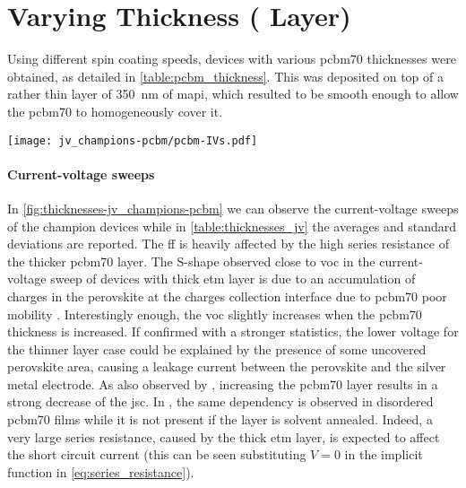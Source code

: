 \section{Varying  Thickness ( Layer)}
Using different spin coating speeds, devices with various \gls{pcbm70} thicknesses were obtained, as detailed in \cref{table:pcbm_thickness}.
This was deposited on top of a rather thin layer of \SI{350}{\nm} of \gls{mapi}, which resulted to be smooth enough to allow the \gls{pcbm70} to homogeneously cover it.

\begin{SCfigure}
	\centering
	\texttt{[image: jv\_champions-pcbm/pcbm-IVs.pdf]}
	\label{fig:thicknesses-jv_champions-pcbm}
\end{SCfigure}

\paragraph{Current-voltage sweeps}
In \cref{fig:thicknesses-jv_champions-pcbm} we can observe the current-voltage sweeps of the champion devices while in \cref{table:thicknesses_jv} the averages and standard deviations are reported.
The \gls{ff} is heavily affected by the high series resistance of the thicker \gls{pcbm70} layer.
The S-shape observed close to \gls{voc} in the current\hyp{}voltage sweep of devices with thick \gls{etm} layer is due to an accumulation of charges in the perovskite at the charges collection interface \cite{Wheeler2015} due to \gls{pcbm70} poor mobility \cite{VonHauff2005}. 
Interestingly enough, the \gls{voc} slightly increases when the \gls{pcbm70} thickness is increased.
If confirmed with a stronger statistics, the lower voltage for the thinner layer case could be explained by the presence of some uncovered perovskite area, causing a leakage current between the perovskite and the silver metal electrode.
As also observed by , increasing the \gls{pcbm70} layer results in a strong decrease of the \gls{jsc}.
In , the same dependency is observed in disordered \gls{pcbm70} films while it is not present if the layer is solvent annealed.
Indeed, a very large series resistance, caused by the thick \gls{etm} layer, is expected to affect the short circuit current (this can be seen substituting $V=0$ in the implicit function in \cref{eq:series_resistance}).


